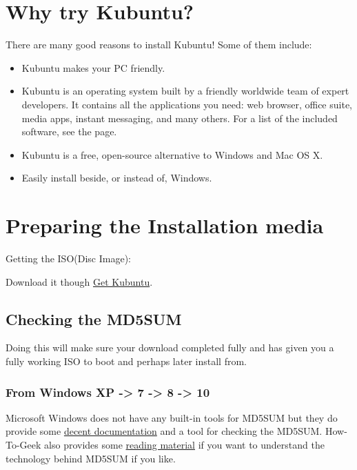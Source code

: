 \documentclass[letterpaper,10pt,english]{sphinxmanual}
\begin{document}
\section{Why try Kubuntu?}
\label{\detokenize{docs/installation:why-try-kubuntu}}
There are many good reasons to install Kubuntu!
Some of them include:
\begin{itemize}
\item {} 
Kubuntu makes your PC friendly.

\item {} 
Kubuntu is an operating system built by a friendly worldwide team of expert developers.
It contains all the applications you need: web browser, office suite, media apps,
instant messaging, and many others. For a list of the included software, see the
{\hyperref[\detokenize{docs/software:software-link}]{}} page.

\item {} 
Kubuntu is a free, open-source alternative to Windows and Mac OS X.

\item {} 
Easily install beside, or instead of, Windows.

\end{itemize}


\section{Preparing the Installation media}
\label{\detokenize{docs/installation:preparing-the-installation-media}}\label{\detokenize{docs/installation:get-kubuntu-link}}
Getting the ISO(Disc Image):

Download it though \href{http://www.kubuntu.org/getkubuntu/}{Get Kubuntu}.


\subsection{Checking the MD5SUM}
\label{\detokenize{docs/installation:checking-the-md5sum}}\label{\detokenize{docs/installation:checksum-link}}
Doing this will make sure your download completed fully and has given you a fully working ISO to boot and perhaps later install from.


\subsubsection{From Windows XP -\textgreater{} 7 -\textgreater{} 8 -\textgreater{} 10}
\label{\detokenize{docs/installation:from-windows-xp-7-8-10}}
Microsoft Windows does not have any built-in tools for MD5SUM but they do
provide some \href{https://support.microsoft.com/en-us/kb/841290}{decent documentation} and a tool for checking the MD5SUM. How-To-Geek also provides some \href{http://www.howtogeek.com/67241/htg-explains-what-are-md5-sha-1-hashes-and-how-do-i-check-them/}{reading material} if you want to understand the technology behind MD5SUM if you like.
\end{document}
